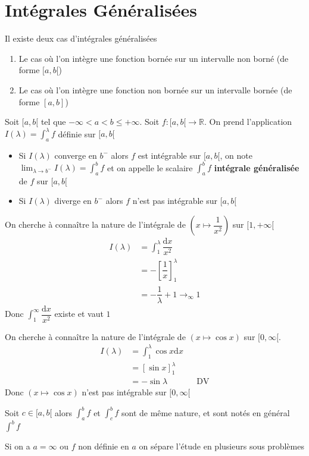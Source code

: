 \documentclass[11pt,colorlinks]{book}
\theoremstyle{mytheoremstyle}
\theoremstyle{mytheoremstyle}
\theoremstyle{mytheoremstyle}
\theoremstyle{mytheoremstyle}
\theoremstyle{mytheoremstyle}
\theoremstyle{mytheoremstyle}
\theoremstyle{mytheoremstyle}
\theoremstyle{mytheoremstyle}
\theoremstyle{myproblemstyle}
\def\mbb#1{\mathbb{#1}}
\def\bR{\mbb{R}}
\begin{document}
  \section{Intégrales Généralisées}
  Il existe deux cas d'intégrales généralisées
  \begin{enumerate}
    \item Le cas où l'on intègre une fonction bornée sur un intervalle non borné (de forme $[a,b[$)
    \item Le cas où l'on intègre une fonction non bornée sur un intervalle bornée (de forme $[a,b]$)
  \end{enumerate}
  \begin{definition}
    Soit $[a,b[$ tel que $-\infty < a < b \leq +\infty$.
    Soit $f : [a,b[ \to \bR$. On prend l'application $I(\lambda) = \int_a^{\lambda} f$ définie sur $[a,b[$
    \begin{itemize}
      \item Si $I(\lambda)$ converge en $b^{-}$ alors $f$ est intégrable sur $[a,b[$, 
      on note $\lim_{\lambda \to b^{-}} I(\lambda) = \int_a^b f$ et on appelle 
      le scalaire $\int_a^b f$ \textbf{intégrale généralisée} de $f$ sur $[a,b[$
      \item Si $I(\lambda)$ diverge en $b^{-}$ alors $f$ n'est pas intégrable sur $[a,b[$
    \end{itemize}
  \end{definition}
  \begin{ex}
    On cherche à connaître la nature de l'intégrale de $\left(x \mapsto \dfrac{1}{x^2}\right)$ sur $[1,+\infty[$
    \begin{align*}
      I(\lambda) &= \int_1^{\lambda} \dfrac{\text{d}x}{x^2} \\ 
                &= - \left[\dfrac{1}{x}\right]_1^{\lambda} \\ 
                &= - \dfrac{1}{\lambda} + 1 \to_{\infty} 1
    \end{align*}
    Donc $\int_1^{\infty} \dfrac{\text{d}x}{x^2}$ existe et vaut $1$
  \end{ex}
  \begin{ex}
    On cherche à connaître la nature de l'intégrale de $\left(x \mapsto \cos x\right)$ sur $[0,\infty[$.
    \begin{align*}
      I(\lambda) &= \int_1^{\lambda} \cos x \text{d}x \\ 
                &= \left[\sin x\right]_1^{\lambda} \\ 
                &= - \sin \lambda && \text{DV}
    \end{align*}
    Donc $\left(x \mapsto \cos x\right)$ n'est pas intégrable sur $[0,\infty[$
  \end{ex}
  \begin{rmq}
    Soit $c \in [a,b[$ alors $\int_a^b f$ et $\int_c^b f$ sont de même nature, et sont notés en général $\int^b f$
  \end{rmq}
  \begin{rmq}
    Si on a $a = \infty$ ou $f$ non définie en $a$ on sépare l'étude en plusieurs sous problèmes
  \end{rmq}
\end{document}
